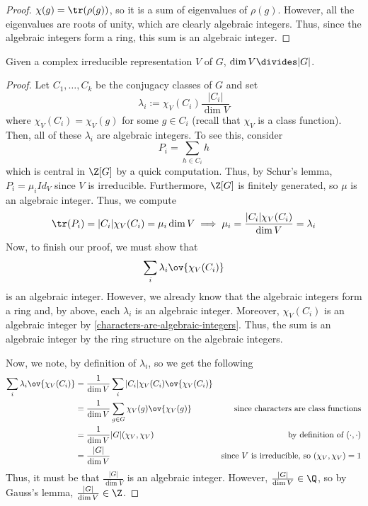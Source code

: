 \documentclass[11pt,leqno,oneside]{amsbook}
\numberwithin{thm}{section}
\begin{document}
\begin{proof}
  \(\chi(g) = \tr(\rho(g))\), so it is a sum of eigenvalues of
  \(\rho(g)\). However, all the eigenvalues are roots of unity, which
  are clearly algebraic integers. Thus, since the algebraic integers
  form a ring, this sum is an algebraic integer.
\end{proof}
\begin{thm}
  Given a complex irreducible representation \(V\) of \(G\), \(\dim V
  \divides |G|\). 
\end{thm}
\begin{proof}
  Let \(C_1, \ldots, C_k\) be the conjugacy classes of \(G\) and set \[
    \lambda_i := \chi_V(C_i) \frac{|C_i|}{\dim V}
  \]
  where \(\chi_V(C_i) = \chi_V(g)\) for some \(g \in C_i\) (recall
  that \(\chi_V\) is a class function). Then, all of these
  \(\lambda_i\) are algebraic integers. To see this, consider \[
    P_i = \sum_{h \in C_i} h
  \]
  which is central in \(\Z[G]\) by a quick computation. Thus, by
  Schur's lemma, \(P_i = \mu_i Id_V\) since \(V\) is irreducible. Furthermore,
  \(\Z[G]\) is finitely generated, so \(\mu\) is an algebraic
  integer. Thus, we compute \[
    \tr(P_i) = |C_i| \chi_V(C_i) = \mu_i \dim V \implies \mu_i =
    \frac{|C_i| \chi_V(C_i)}{\dim V} = \lambda_i
  \]
  Now, to finish our proof, we must show that \[
    \sum_i \lambda_i \ov{\chi_V(C_i)}
  \]
  is an algebraic integer. However, we already know that the algebraic
  integers form a ring and, by above, each \(\lambda_i\) is an
  algebraic integer. Moreover, \(\chi_V(C_i)\) is an algebraic integer
  by \ref{characters-are-algebraic-integers}. Thus, the sum is an
  algebraic integer by the ring structure on the algebraic integers.

  Now, we note, by definition of \(\lambda_i\), so we get the
  following
  \begin{align*}
    \sum_{i} \lambda_i \ov{\chi_V(C_i)}
    & = \frac{1}{\dim V}\sum_i |C_i| \chi_V(C_i) \ov{\chi_V(C_i)} \\
    & = \frac{1}{\dim V}\sum_{g \in G} \chi_V(g) \ov{\chi_V(g)}
    & \text{since characters are class functions} \\
    & = \frac{1}{\dim V} |G| (\chi_V,\chi_V) & \text{by definition of
                                               }(\cdot, \cdot)\\
    & = \frac{|G|}{\dim V} & \text{since }V\text{ is irreducible, so
                             }(\chi_V, \chi_V) = 1    
  \end{align*}
  Thus, it must be that \(\frac{|G|}{\dim V}\) is an algebraic
  integer. However, \(\frac{|G|}{\dim V} \in \Q\), so by Gauss's
  lemma, \(\frac{|G|}{\dim V} \in \Z\).
\end{proof}
\end{document}
